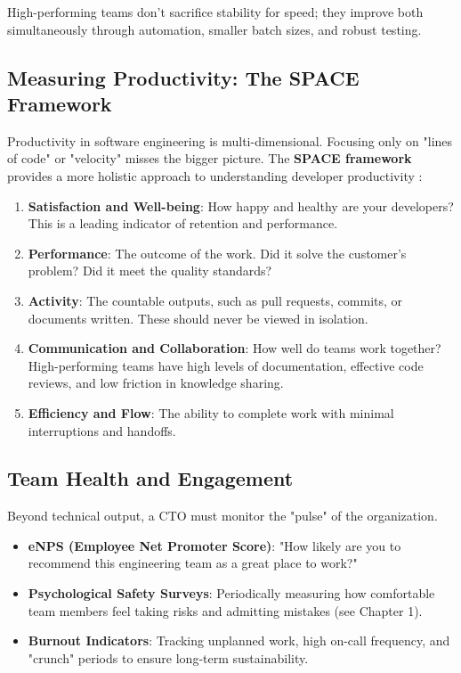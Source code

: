 
High-performing teams don't sacrifice stability for speed; they improve both simultaneously through automation, smaller batch sizes, and robust testing.

\subsection{Measuring Productivity: The SPACE Framework}
Productivity in software engineering is multi-dimensional. Focusing only on "lines of code" or "velocity" misses the bigger picture. The \textbf{SPACE framework} provides a more holistic approach to understanding developer productivity \cite{forsgren2021space}:

\begin{enumerate}
    \item \textbf{Satisfaction and Well-being}: How happy and healthy are your developers? This is a leading indicator of retention and performance.
    \item \textbf{Performance}: The outcome of the work. Did it solve the customer's problem? Did it meet the quality standards?
    \item \textbf{Activity}: The countable outputs, such as pull requests, commits, or documents written. These should never be viewed in isolation.
    \item \textbf{Communication and Collaboration}: How well do teams work together? High-performing teams have high levels of documentation, effective code reviews, and low friction in knowledge sharing.
    \item \textbf{Efficiency and Flow}: The ability to complete work with minimal interruptions and handoffs.
\end{enumerate}


\subsection{Team Health and Engagement}
Beyond technical output, a CTO must monitor the "pulse" of the organization. 
\begin{itemize}
    \item \textbf{eNPS (Employee Net Promoter Score)}: "How likely are you to recommend this engineering team as a great place to work?"
    \item \textbf{Psychological Safety Surveys}: Periodically measuring how comfortable team members feel taking risks and admitting mistakes (see Chapter 1).
    \item \textbf{Burnout Indicators}: Tracking unplanned work, high on-call frequency, and "crunch" periods to ensure long-term sustainability.
\end{itemize}

